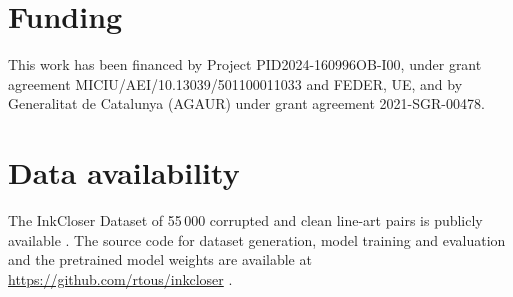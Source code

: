 \documentclass[preprint,12pt]{elsarticle}
\begin{document}
\section*{Funding}
This work has been financed by Project PID2024-160996OB-I00, under grant agreement
MICIU/AEI/10.13039/501100011033 and FEDER, UE, and by Generalitat de Catalunya (AGAUR)
under grant agreement 2021-SGR-00478.

\section*{Data availability}
The InkCloser Dataset of 55\,000 corrupted and clean line-art pairs is publicly
available \citep{datasetInkCloser}. The source code for dataset generation, model
training and evaluation and the pretrained model weights are available at
\url{https://github.com/rtous/inkcloser} \citep{codeInkCloser}.



\end{document}
